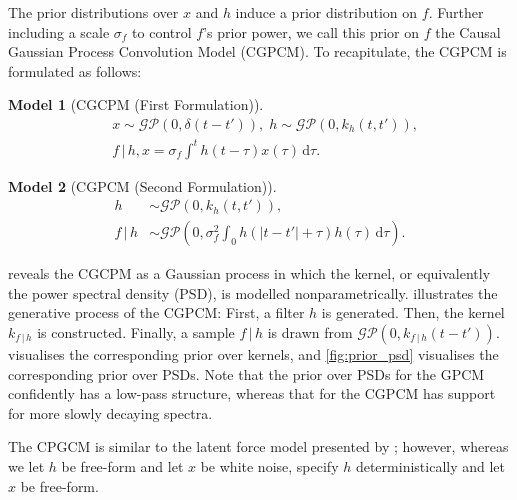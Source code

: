 \documentclass{article}
\newcommand{\id}[1]{\, \mathrm{d} #1}     %
\newcommand{\cond}{\, | \,}               %
\newtheorem{model}{Model}
\begin{document}
The prior distributions over $x$ and $h$ induce a prior distribution on $f$. Further including a scale $\sigma_f$ to control $f$'s prior power, we call this prior on $f$ the Causal Gaussian Process Convolution Model (CGPCM). To recapitulate, the CGPCM is formulated as follows:

\begin{model}[CGCPM (First Formulation)] \label{mod:cgpcm}
    \begin{align*}
        &x \sim \mathcal{GP}(0,\delta(t-t')), \;
        h \sim \mathcal{GP}(0, k_h(t,t')), \\
        &f\cond h, x = \sigma_f \int^t h(t- \tau)x(\tau)\id{\tau}.
    \end{align*}
\end{model}
\begin{model}[CGPCM (Second Formulation)] \label{mod:cgpcm2}
    \begin{align*}
        h &\sim \mathcal{GP}(0, k_h(t,t')), \\
        f \cond h &\sim \mathcal{GP}\left(0,  \sigma_f^2\int_0 h(|t-t'|+\tau)h(\tau)\id{\tau} \right).
    \end{align*}
\end{model}

 reveals the CGCPM as a Gaussian process in which the kernel, or equivalently the power spectral density (PSD), is modelled nonparametrically.  illustrates the generative process of the CGPCM: First, a filter $h$ is generated. Then, the kernel $k_{f\cond h}$ is constructed. Finally, a sample $f\cond h$ is drawn from $\mathcal{GP}(0,k_{f \cond h}(t-t'))$.  visualises the corresponding prior over kernels, and \cref{fig:prior_psd} visualises the corresponding prior over PSDs. Note that the prior over PSDs for the GPCM confidently has a low-pass structure, whereas that for the CGPCM has support for more slowly decaying spectra.

The CPGCM is similar to the latent force model presented by \citet{Alvarez:2009:Latent_Force_Models}; however, whereas we let $h$ be free-form and let $x$ be white noise, \citet{Alvarez:2009:Latent_Force_Models} specify $h$ deterministically and let $x$ be free-form.
\end{document}
